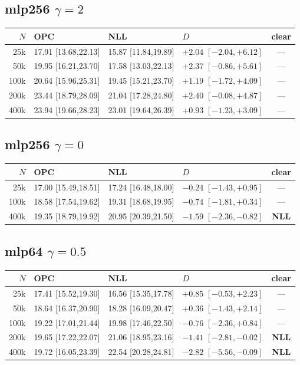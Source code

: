 \documentclass[10pt]{article}
\begin{document}
\subsection*{mlp256 $\gamma{=}2$}
{\scriptsize
\begin{tabular}{@{}r lll c@{}}
\toprule
$N$ & OPC & NLL & $D$ & clear \\
\midrule
25k & 17.91 [13.68,22.13] & 15.87 [11.84,19.89] & $+2.04$ $[-2.04,+6.12]$ & — \\
50k & 19.95 [16.21,23.70] & 17.58 [13.03,22.13] & $+2.37$ $[-0.86,+5.61]$ & — \\
100k & 20.64 [15.96,25.31] & 19.45 [15.21,23.70] & $+1.19$ $[-1.72,+4.09]$ & — \\
200k & 23.44 [18.79,28.09] & 21.04 [17.28,24.80] & $+2.40$ $[-0.08,+4.87]$ & — \\
400k & 23.94 [19.66,28.23] & 23.01 [19.64,26.39] & $+0.93$ $[-1.23,+3.09]$ & — \\
\bottomrule
\end{tabular}}

\subsection*{mlp256 $\gamma{=}0$}
{\scriptsize
\begin{tabular}{@{}r lll c@{}}
\toprule
$N$ & OPC & NLL & $D$ & clear \\
\midrule
25k & 17.00 [15.49,18.51] & 17.24 [16.48,18.00] & $-0.24$ $[-1.43,+0.95]$ & — \\
100k & 18.58 [17.54,19.62] & 19.31 [18.68,19.95] & $-0.74$ $[-1.81,+0.34]$ & — \\
400k & 19.35 [18.79,19.92] & 20.95 [20.39,21.50] & $-1.59$ $[-2.36,-0.82]$ & \textbf{NLL} \\
\bottomrule
\end{tabular}}

\subsection*{mlp64 $\gamma{=}0.5$}
{\scriptsize
\begin{tabular}{@{}r lll c@{}}
\toprule
$N$ & OPC & NLL & $D$ & clear \\
\midrule
25k & 17.41 [15.52,19.30] & 16.56 [15.35,17.78] & $+0.85$ $[-0.53,+2.23]$ & — \\
50k & 18.64 [16.37,20.90] & 18.28 [16.09,20.47] & $+0.36$ $[-1.43,+2.14]$ & — \\
100k & 19.22 [17.01,21.44] & 19.98 [17.46,22.50] & $-0.76$ $[-2.36,+0.84]$ & — \\
200k & 19.65 [17.22,22.07] & 21.06 [18.95,23.16] & $-1.41$ $[-2.81,-0.02]$ & \textbf{NLL} \\
400k & 19.72 [16.05,23.39] & 22.54 [20.28,24.81] & $-2.82$ $[-5.56,-0.09]$ & \textbf{NLL} \\
\bottomrule
\end{tabular}}
\end{document}
